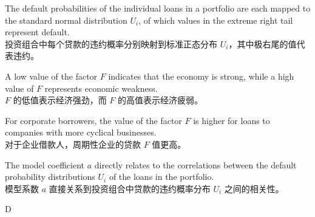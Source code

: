 \documentclass{article}
\begin{document}
\begin{choices}
    \item The default probabilities of the individual loans in a portfolio are each mapped to the standard normal distribution \(U_i\), of which values in the extreme right tail represent default.\\
    投资组合中每个贷款的违约概率分别映射到标准正态分布 \(U_i\)，其中极右尾的值代表违约。
    
    \item A low value of the factor \(F\) indicates that the economy is strong, while a high value of \(F\) represents economic weakness.\\
    \(F\) 的低值表示经济强劲，而 \(F\) 的高值表示经济疲弱。
    
    \item For corporate borrowers, the value of the factor \(F\) is higher for loans to companies with more cyclical businesses.\\
    对于企业借款人，周期性企业的贷款 \(F\) 值更高。
    
    \item The model coefficient \(a\) directly relates to the correlations between the default probability distributions \(U_i\) of the loans in the portfolio.\\
    模型系数 \(a\) 直接关系到投资组合中贷款的违约概率分布 \(U_i\) 之间的相关性。
\end{choices}

\begin{correctanswer}
    D
\end{correctanswer}
\end{document}
